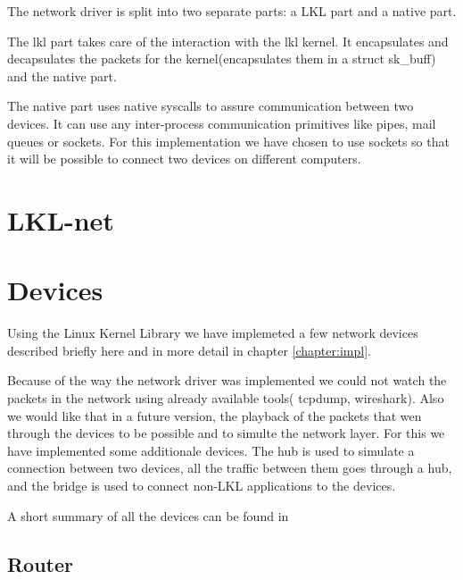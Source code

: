 The network driver is split into two separate parts: a LKL part and a native part.

The lkl part takes care of the interaction with the lkl kernel. It encapsulates
and decapsulates the packets for the kernel(encapsulates them in a struct sk_buff)
and the native part.

The native part uses native syscalls to assure communication between two devices.
It can use any inter-process communication primitives like pipes, mail queues or sockets.
For this implementation we have chosen to use sockets so that it will be possible
to connect two devices on different computers.


\section{LKL-net}
\label{sec:lkl-net}

\textbf{\project}



\theproject

\section{Devices}
\label{sec:devices}

Using the Linux Kernel Library we have implemeted a few network devices described briefly
here and in more detail in chapter \ref{chapter:impl}.

Because of the way the network driver was implemented we could not watch the packets in the
network using already available tools( tcpdump, wireshark). Also we would like that in a future version,
the playback of the packets that wen through the devices to be possible and to simulte the network layer.
For this we have implemented some additionale devices. The hub is used to simulate a connection between 
two devices, all the traffic between them goes through a hub, and the bridge is used to connect non-LKL 
applications to the \text{\project} devices.

A short summary of all the devices can be found in 

\subsection{Router}
\label{sub-sec:router}

